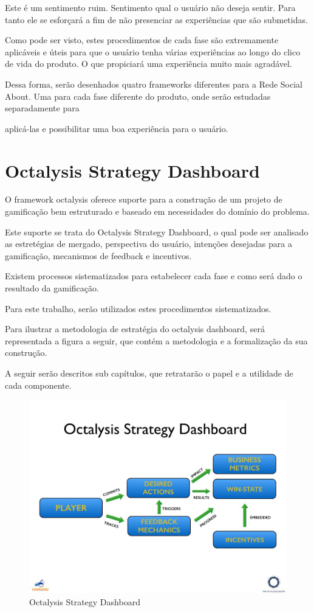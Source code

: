 Este é um sentimento ruim. Sentimento qual o usuário não deseja sentir. Para tanto
ele se esforçará a fim de não presenciar as experiências que são submetidas.

Como pode ser visto, estes procedimentos de cada fase são extremamente aplicáveis
e úteis para que o usuário tenha várias experiências ao longo do clico de vida do
produto. O que propiciará uma experiência muito mais agradável.

Dessa forma, serão desenhados quatro frameworks diferentes para a Rede Social About.
Uma para cada fase diferente do produto, onde serão estudadas separadamente para

aplicá-las e possibilitar uma boa experiência para o usuário.

\section{Octalysis Strategy Dashboard}
\label{sec:octalysisdashborad}
O framework octalysis oferece suporte para a construção de um projeto de gamificação
bem estruturado e baseado em necessidades do domínio do problema.

Este suporte se trata do Octalysis Strategy Dashboard, o qual pode ser analisado
 as
estretégias de mergado, perspectiva do usuário, intenções desejadas para a gamificação,
mecanismos de feedback e incentivos.

Existem processos sistematizados para estabelecer cada fase e como será dado o 
resultado da gamificação. 

Para este trabalho, serão utilizados estes procedimentos sistematizados. 

Para ilustrar a metodologia de estratégia do octalysis dashboard, será representada
a figura a seguir, que contém a metodologia e a formalização da sua construção.

A seguir serão descritos sub capítulos, que retratarão o papel e a utilidade de 
cada
componente.


 \begin{figure}[h]
     \centering

     \includegraphics[width=450px, scale=1]{figuras/dashboard}
     \caption{Octalysis Strategy Dashboard}

     \label{fig:dashboard}
 \end{figure}

